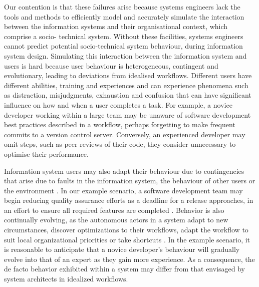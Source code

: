 \documentclass{llncs}
\begin{document}

Our contention is that these failures arise because systems engineers lack the
tools and methods to efficiently model and accurately
simulate the interaction between the information systems and their organisational context, which comprise a socio-
technical system. Without these facilities, systems engineers cannot predict potential socio-technical system behaviour,
during information system design. Simulating this interaction between the information system and users is hard because
user behaviour is heterogeneous, contingent and evolutionary, leading to deviations from idealised workflows.  Different
users have different abilities, training and experiences and can experience phenomena such as distraction, misjudgments,
exhaustion and confusion that can have significant influence on how and when a user completes a task.  For example, a
novice developer working within a large team may be unaware of software development best practices described in a
workflow, perhaps forgetting to make frequent commits to a version control server.  Conversely, an experienced developer
may omit steps, such as peer reviews of their code, they consider unnecessary to optimise their performance.

Information system users may also adapt their behaviour due to contingencies that arise due to faults in the information
system, the behaviour of other users or the environment \citep{sommerville09deriving}.  In our example scenario, a
software development team may begin reducing quality assurance efforts as a deadline for a release approaches, in an
effort to ensure all required features are completed \citep{beck02test}. Behavior is also continually evolving, as the
autonomous actors in a system adapt to new circumstances, discover optimizations to their workflows, adapt the workflow
to suit local organizational priorities or take shortcuts \citep{bonen79evolutionary}.  In the example scenario, it is
reasonable to anticipate that a novice developer's behaviour will gradually evolve into that of an expert as they gain
more experience.  As a consequence, the de facto behavior exhibited within a system may differ from that envisaged by
system architects in idealized workflows.
\end{document}
